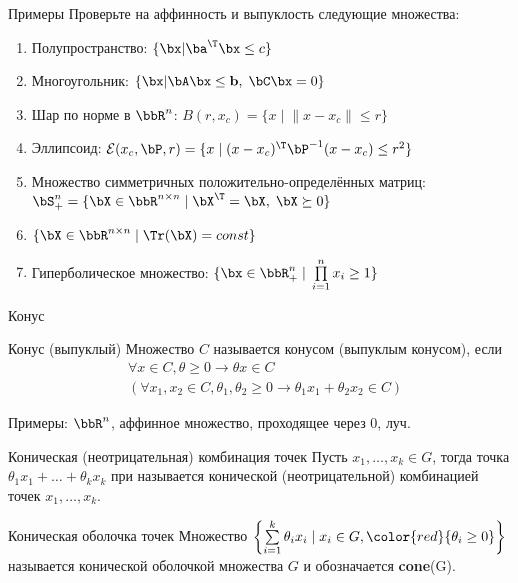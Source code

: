 \documentclass[12pt,russian]{beamer}
\begin{document}
\begin{frame}{Примеры}
Проверьте на аффинность и выпуклость следующие множества:
\begin{enumerate}
\item Полупространство: $\{ \bx | \ba^{\T} \bx \leq c \}$
\item Многоугольник: $\{ \bx | \bA\bx \leq \mathbf{b}, \; \bC\bx = 0 \}$
\item Шар по норме в $\bbR^n$: $B(r, x_c) = \{ x \; | \; \| x - x_c \| \leq r \}$
\item Эллипсоид: $\mathcal{E}(x_c, \bP, r) = \{ x \; | \; (x - x_c)^{\T}\bP^{-1} (x - x_c) \leq r^2 \}$
\item Множество симметричных положительно-определённых матриц: $\bS^n_+ = \{ \bX \in \bbR^{n \times n} \; | \; \bX^{\T} = \bX, \; \bX \succeq 0 \}$
\item $\{ \bX \in \bbR^{n \times n} \; | \; \Tr(\bX) = const \}$
\item Гиперболическое множество: $\{ \bx \in \bbR^n_+ \; | \; \prod\limits_{i=1}^n x_i \geq 1 \}$
\end{enumerate}
\end{frame}

\begin{frame}{Конус}
\small
\begin{block}{Конус (выпуклый)}
Множество $C$ называется конусом (выпуклым конусом), если 
\vspace{-4mm}
\begin{equation*}
\begin{split}
& \forall x \in C, \theta \geq 0 \rightarrow \theta x \in C \\
& (\forall x_1, x_2 \in C, \theta_1, \theta_2 \geq 0 \rightarrow \theta_1 x_1 + \theta_2 x_2 \in C)
\end{split}
\end{equation*}
\vspace{-4mm}
\end{block}
Примеры: $\bbR^n$, аффинное множество, проходящее через 0, луч.
\begin{block}{Коническая (неотрицательная) комбинация точек}
Пусть $x_1, \ldots, x_k \in G$, тогда точка $\theta_1 x_1 + \ldots + \theta_k x_k$ при {\color{red}{$\theta_i \geq 0$}} называется конической (неотрицательной) комбинацией точек $x_1,\ldots,x_k$.
\end{block}

\begin{block}{Коническая оболочка точек}
Множество $\left\{ \sum\limits_{i=1}^k \theta_i x_i \; | \; x_i \in G, {\color{red}{\theta_i \geq 0}} \right\}$ называется конической оболочкой множества $G$ и обозначается \textbf{cone}(G).
\end{block}
\end{frame}
\end{document}
